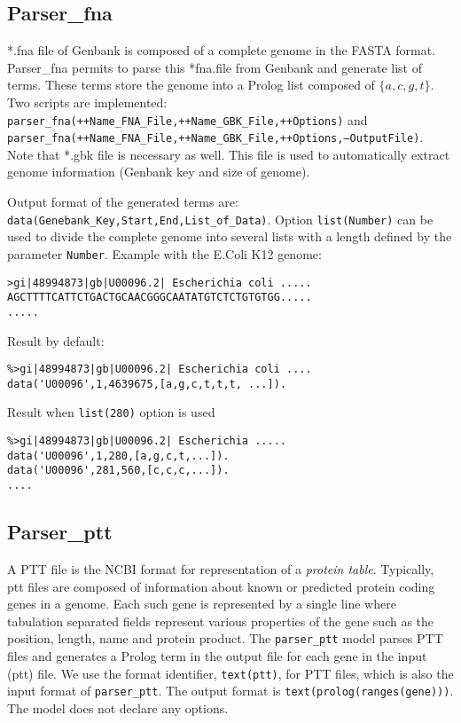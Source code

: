 \documentclass{book}
\begin{document}
\subsection{Parser\_fna}

*.fna file of Genbank is composed of a complete genome in the FASTA format.
Parser\_fna permits to parse this *fna.file from Genbank and generate
list of terms. These terms store the genome into a Prolog list
composed of $\{a,c,g,t\}$. Two scripts are implemented:\\ 
\texttt{parser\_fna(++Name\_FNA\_File,++Name\_GBK\_File,++Options)} and \\
\texttt{parser\_fna(++Name\_FNA\_File,++Name\_GBK\_File,++Options,--OutputFile)}. \\
Note that *.gbk file is necessary as well. This file is used to automatically extract
genome information (Genbank key and size of genome).

Output format of the generated terms are:\\
\texttt{data(Genebank\_Key,Start,End,List\_of\_Data)}.
Option \texttt{list(Number)} can be used to divide the complete
genome into several lists with a length defined by the parameter
\texttt{Number}.
Example with the E.Coli K12 genome:
\begin{verbatim}
>gi|48994873|gb|U00096.2| Escherichia coli .....
AGCTTTTCATTCTGACTGCAACGGGCAATATGTCTCTGTGTGG.....
.....
\end{verbatim}
Result by default:
\begin{verbatim}
%>gi|48994873|gb|U00096.2| Escherichia coli ....
data('U00096',1,4639675,[a,g,c,t,t,t, ...]). 
\end{verbatim}
Result when \texttt{list(280)} option is used
\begin{verbatim}
%>gi|48994873|gb|U00096.2| Escherichia .....
data('U00096',1,280,[a,g,c,t,...]).
data('U00096',281,560,[c,c,c,...]).
....
\end{verbatim}

\subsection{Parser\_ptt}

A PTT file is the NCBI format for representation of a \emph{protein table}.
Typically, ptt files are composed of information about known or predicted
protein coding genes in a genome. Each such gene is represented
by a single line where tabulation separated fields represent various
properties of the gene such as the position, length, name and protein
product. The \texttt{parser\_ptt} model parses PTT files and generates
a Prolog term in the output file for each gene in the input (ptt) file.
We use the format identifier, \texttt{text(ptt)}, for PTT files, which
is also the input format of \texttt{parser\_ptt}. The output format is
\texttt{text(prolog(ranges(gene)))}. The model does not declare any options.
\end{document}
